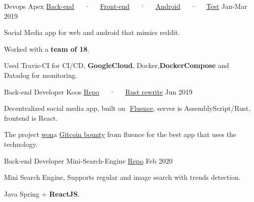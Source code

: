 

\begin{cventries}

  \cventry
    {Devops} %
    {Apex \tiny{\href{https://www.github.com/DarkGeekMS/ApeX-Server}{Back-end}~~~·~~~\href{http://www.github.com/DarkGeekMS/ApeX-Web}{Front-end}~~~·~~~\href{http://www.github.com/DarkGeekMS/ApeX-Mobile}{Android}~~~·~~~\href{https://www.github.com/DarkGeekMS/apeXTesting}{Test}}} %
    {} %
    {Jan-Mar 2019} %
    {
      \begin{cvitems} %
        \item {Social Media app for web and android that mimics reddit.}
        \item {Worked with a \textbf{team of 18}.}
        \item {Used ​Travis-CI ​for CI/CD, \textbf{​GoogleCloud​}, Docker, \textbf{​DockerCompose​} and Datadog for monitoring.}
      \end{cvitems}
    }

  \cventry
    {Back-end Developer} %
    {Koos \tiny{\href{https://gitlab.com/koos-project/koos}{Repo}~~~·~~~\href{https://gitlab.com/koos-project/koos/tree/rust-migration/server}{Rust rewrite}}} %
    {} %
    {Jun 2019} %
    {
      \begin{cvitems} %
        \item {Decentralized social media app, built on ​ \href{http://fluence.dev/}{Fluence​}, server is AssemblyScript/Rust, frontend is React.}
        \item {The project \href{https://www.linkedin.com/feed/update/urn:li:activity:6575339127934341120/}{​won​} a ​\href{https://gitcoin.co/issue/fluencelabs/Bounties/1/3290}{Gitcoin bounty​} from fluence for the best app that uses the technology.}
      \end{cvitems}
    }

  \cventry
    {Back-end Developer} %
    {Mini-Search-Engine \tiny{\href{https://github.com/mido3ds/mini-search-engine/}{Repo}}} %
    {} %
    {Feb 2020} %
    {
      \begin{cvitems} %
        \item {Mini Search Engine, Supports regular and image search with trends detection.}
        \item {Java Spring + \textbf{ReactJS}.}
      \end{cvitems}
    }


\end{cventries}
